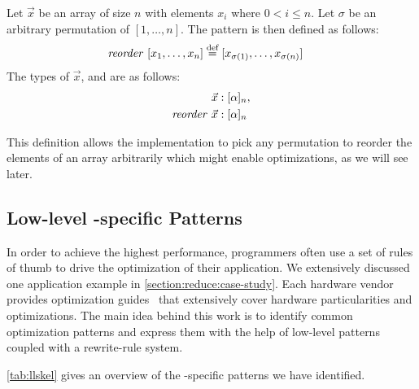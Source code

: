 \begin{definition}
  \label{definition:pattern:reorder}
  Let $\vec{x}$ be an array of size $n$ with elements $x_i$ where $0 < i \leq n$.
  Let $\sigma$ be an arbitrary permutation of $[1,\ldots, n]$.
  The \reorder pattern is then defined as follows:
  \begin{align*}
    \text{\textit{reorder}}\ [x_1, \ldots, x_n] &\stackrel{\textrm{\scriptsize def}}{=} [x_{\sigma(1)}, \ldots, x_{\sigma(n)}]
  \end{align*}
  The types of $\vec{x}$, and \reorder are as follows:
  \begin{align*}
    \vec{x} &: [\alpha]_n,\\
    \text{\textit{reorder}}\ \vec{x} &: [\alpha]_n
  \end{align*}
\end{definition}

\noindent
This definition allows the implementation to pick any permutation to reorder the elements of an array arbitrarily which might enable optimizations, as we will see later.





\subsection{Low-level \OpenCL-specific Patterns}

In order to achieve the highest performance, programmers often use a set of rules of thumb to drive the optimization of their application.
We extensively discussed one application example in \autoref{section:reduce:case-study}.
Each hardware vendor provides optimization guides~\cite{CUDAProgrammingGuide,AMDProgrammingGuide,IntelGPUProgrammingGuide,IntelXeonProgrammingGuide} that extensively cover hardware particularities and optimizations.
The main idea behind this work is to identify common optimization patterns and express them with the help of low-level patterns coupled with a rewrite-rule system.

\autoref{tab:llskel} gives an overview of the \OpenCL-specific patterns we have identified.

